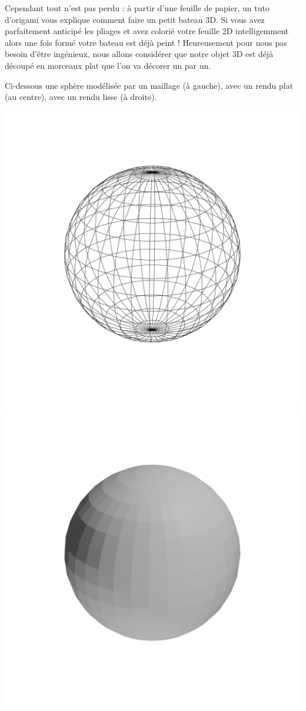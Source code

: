 \documentclass[11pt,class=report,crop=false]{standalone}
\begin{document}
Cependant tout n'est pas perdu : à partir d'une feuille de papier, un tuto d'origami vous explique comment faire un petit bateau 3D. Si vous avez parfaitement anticipé les pliages et avez colorié votre feuille 2D intelligemment alors une fois formé votre bateau est déjà peint !
Heureusement pour nous pas besoin d'être ingénieux, nous allons considérer que notre objet 3D est déjà découpé en morceaux plat que l'on va décorer un par un.

Ci-dessous une sphère modélisée par un maillage (à gauche), avec un rendu plat (au centre), avec un rendu lisse (à droite).

\begin{center}
\includegraphics[scale=\myscale,scale=0.15,trim={3cm 7cm 3cm  7cm},clip]{figures/texture-sphere-frame}
\includegraphics[scale=\myscale,scale=0.15,trim={3cm 7cm 3cm 7cm},clip]{figures/texture-sphere-flat}

\end{center}
\end{document}
